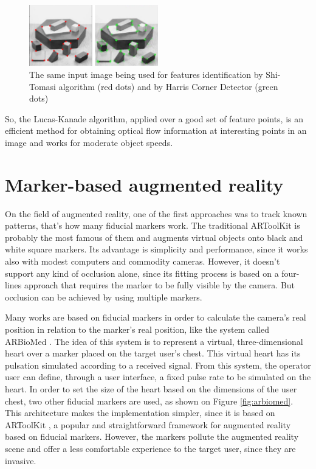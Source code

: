 \documentclass[msc, a4paper, classic, en]{ufbathesis}
\begin{document}
\begin{figure}
\centering
\includegraphics[width=0.5\textwidth]{images/shi-harris.png}
\caption{The same input image being used for features identification by Shi-Tomasi algorithm (red dots) and by Harris Corner Detector (green dots)}
\label{fig:shi-harris}
\end{figure}

So, the Lucas-Kanade algorithm, applied over a good set of feature points, is an efficient method for obtaining optical flow information at interesting points in an image and works for moderate object speeds.


\section{Marker-based augmented reality}

On the field of augmented reality, one of the first approaches was to track known patterns, that's how many fiducial markers work. The traditional ARToolKit \cite{artoolkit} is probably the most famous of them and augments virtual objects onto black and white square markers. Its advantage is simplicity and performance, since it works also with modest computers and commodity cameras. However, it doesn't support any kind of occlusion alone, since its fitting process is based on a four-lines approach that requires the marker to be fully visible by the camera. But occlusion can be achieved by using multiple markers.

Many works are based on fiducial markers in order to calculate the camera's real position in relation to the marker's real position, like the system called ARBioMed \cite{arbiomed}. The idea of this system is to represent a virtual, three-dimensional heart over a marker placed on the target user's chest. This virtual heart has its pulsation simulated according to a received signal. From this system, the operator user can define, through a user interface, a fixed pulse rate to be simulated on the heart. In order to set the size of the heart based on the dimensions of the user chest, two other fiducial markers are used, as shown on Figure \ref{fig:arbiomed}. This architecture makes the implementation simpler, since it is based on ARToolKit \cite{artoolkit}, a popular and straightforward framework for augmented reality based on fiducial markers. However, the markers pollute the augmented reality scene and offer a less comfortable experience to the target user, since they are invasive.
\end{document}
